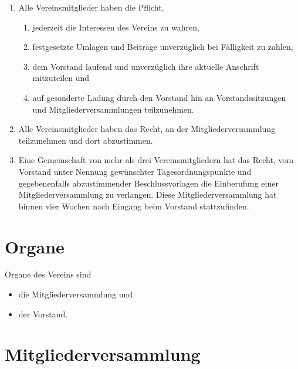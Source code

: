 \documentclass[a4paper, 10pt, headings=normal]{scrartcl}
\begin{document}
\begin{multicols}{2}
\begin{enumerate}[label={(\arabic*)}]
	\item
		Alle Vereinsmitglieder haben die Pflicht,
		\begin{enumerate}[label={\arabic*.}]
			\item
				jederzeit die Interessen des Vereins zu wahren,
			\item
				festgesetzte Umlagen und Beiträge unverzüglich bei Fälligkeit zu zahlen,
			\item
				dem Vorstand laufend und unverzüglich ihre aktuelle Anschrift mitzuteilen und
			\item
				auf gesonderte Ladung durch den Vorstand hin an Vorstandssitzungen und Mitgliederversammlungen teilzunehmen.
		\end{enumerate}
	\item
		Alle Vereinsmitglieder haben das Recht, an der Mitgliederversammlung teilzunehmen und dort abzustimmen.
	\item
		Eine Gemeinschaft von mehr als drei Vereinsmitgliedern hat das Recht, vom Vorstand unter Nennung gewünschter Tagesordnungspunkte und gegebenenfalls abzustimmender Beschlussvorlagen die Einberufung einer Mitgliederversammlung zu verlangen.
		Diese Mitgliederversammlung hat binnen vier Wochen nach Eingang beim Vorstand stattzufinden.
\end{enumerate}

\section{Organe}
\label{par:organe}

Organe des Vereins sind
\begin{itemize}[label={–}]
	\item
		die Mitgliederversammlung und
	\item
		der Vorstand.
\end{itemize}

\section{Mitgliederversammlung}
\label{par:mitgliederversammlung}


\end{multicols}
\end{document}
